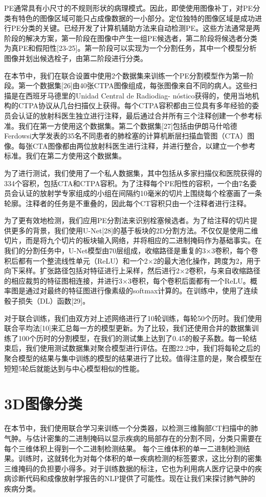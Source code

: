 PE通常具有小尺寸的不规则形状的病理模式。因此，即使使用图像补丁，对PE分类有特色的图像区域可能只占成像数据的一小部分。定位独特的图像区域是成功进行PE分类的关键。已经开发了计算机辅助方法来自动检测PE。这些方法通常是两阶段的解决方案，第一阶段在图像中产生一组PE候选者，第二阶段将候选者分类为真PE和假阳性[23-25]。第一阶段可以实现为一个分割任务，其中一个模型分析图像并划出候选栓子，由第二阶段进行分类。

在本节中，我们在联合设置中使用2个数据集来训练一个PE分割模型作为第一阶段。第一个数据集[26]由40张CTPA图像组成，每张图像来自不同的病人。这些扫描是在西班牙马德里的Unidad Central de Radiodiag- nóstico获得的，使用当地机构的CTPA协议从几台扫描仪上获得。每个CTPA容积都由三位具有多年经验的委员会认证的放射科医生独立进行注释，最后通过合并所有三个注释创建一个参考标准。我们在第一方使用这个数据集。第二个数据集[27]包括由伊朗马什哈德Ferdowsi大学发表的35名不同患者的肺栓塞的计算机断层扫描血管图（CTA）图像。每张CTA图像都由两位放射科医生进行注释，并进行整合，以建立一个参考标准。我们在第二方使用这个数据集。

为了进行测试，我们使用了一个私人数据集，其中包括从多家扫描仪和医院获得的334个容积，包括CTA和CTPA容积。为了注释每个PE阳性的容积，一个由7名委员会认证的放射学专家组成的小组在间隔约10毫米的切片上围绕每个栓塞画了一条轮廓。注释者的任务是不重叠的，因此每个CT容积只由一个注释者进行注释。

为了更有效地检测，我们应用PE分割法来识别栓塞候选者。为了给注释的切片提供更多的背景，我们使用U-Net[28]的基于板块的2D分割方法。不仅仅是使用二维切片，而是将九个切片的板块输入网络，并将相应的二进制掩码作为基础事实。在我们的分割任务中，U-Net模型由70层组成，收缩路径是重复的3×3卷积，每个卷积后都有一个整流线性单元（ReLU）和一个2×2的最大池化操作，跨度为2，用于向下采样。扩张路径包括对特征进行上采样，然后进行2×2卷积，与来自收缩路径的相应裁剪的特征图相连接，并进行3×3卷积，每个卷积后面都有一个ReLU。概率图是通过对最终的特征图进行像素级的softmax计算的。在训练中，使用了连续骰子损失（DL）函数[29]。

对于联合训练，我们由双方对上述网络进行了10轮训练，每轮50个历时。我们使用联合平均法[10]来汇总每一方的模型更新。为了比较，我们还使用合并的数据集训练了100个历时的分割模型，在我们的测试集上达到了0.45的骰子系数。每一轮结束后，我们使用测试数据集对聚合模型进行评估。在图22.2中，我们将每轮之后的聚合模型的结果与集中训练的模型的结果进行了比较。值得注意的是，聚合模型在短短5轮后就能达到与中心模型相似的性能。

\section{3D图像分类}
在本节中，我们使用联合学习来训练一个分类器，以检测三维胸部CT扫描中的肺气肿。与估计密集的二进制掩码以显示疾病的局部存在的分割不同，分类只需要在每个三维体积上得到一个二进制检测结果。 每个三维体积的单一二进制检测结果。训练时，这就转化为对每个体积的单一疾病检测的标签要求，这比分割的密集三维掩码的负担要小得多。对于训练数据的标注，它也为利用病人医疗记录中的疾病诊断代码和成像放射学报告的NLP提供了可能性。现在让我们来探讨肺气肿的疾病分类。


